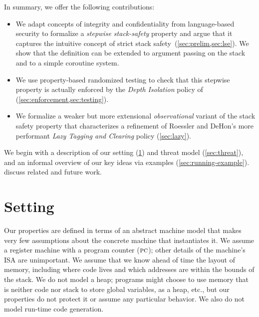 \documentclass[acmsmall,review,anonymous]{acmart}\settopmatter{printfolios=true,printccs=false,printacmref=false}
\begin{document}
In summary, we offer the following contributions:

\begin{itemize}
\item We adapt concepts of integrity and confidentiality from language-based
security to formalize a {\em stepwise stack-safety}
property and argue that it captures the intuitive concept of strict stack
safety~(\cref{sec:prelim,sec:lse}). We show that the definition can be
extended to argument passing on the stack and to a simple coroutine system.
\item We use property-based randomized testing to check that this stepwise
property is actually enforced by the {\em Depth Isolation} policy
of~\citet{DBLP:conf/sp/RoesslerD18} (\cref{sec:enforcement,sec:testing}).
\item We formalize a
weaker but more extensional \emph{observational} variant of the stack safety
property that characterizes a refinement of Roessler and DeHon's more
performant {\em Lazy Tagging and  Clearing} policy (\cref{sec:lazy}).
\end{itemize}

We begin with a description of our setting (\cref{sec:setup}) and threat
model (\cref{sec:threat}), and an informal overview of our key ideas via
examples (\cref{sec:running-example}).  discuss related and future work.

\section{Setting}
\label{sec:setup}

Our properties are defined in terms of an abstract machine model that makes very few
assumptions about the concrete machine that instantiates it.  We assume a register
machine with a program counter (\(\textsc{pc}\)); other
details of the machine's ISA are unimportant. We assume that we know ahead of time
the layout of memory, including where code lives and which addresses are within
the bounds of the stack. We do not model a heap; programs might choose to use memory
that is neither code nor stack to store global variables, as a heap, etc., but our
properties do not protect it or assume any particular behavior. We also do not
model run-time code generation.
\end{document}
